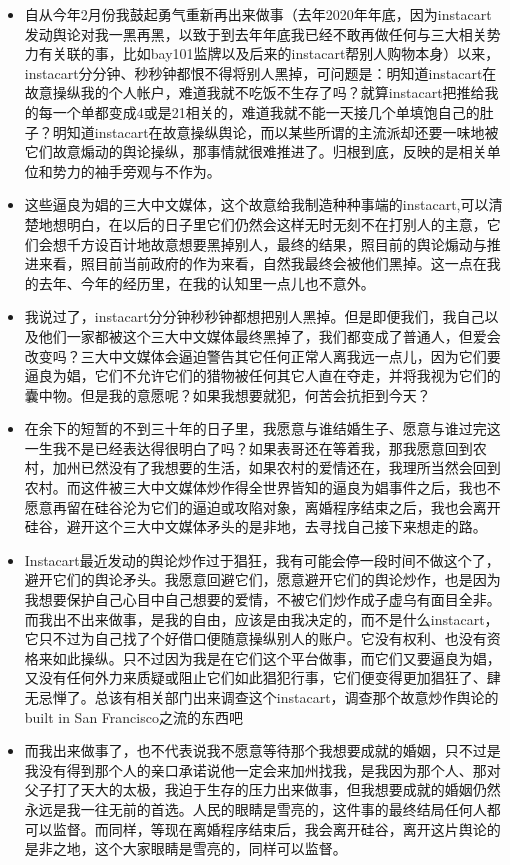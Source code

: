 \documentclass[9pt, b5paper]{article}
\begin{document}
\begin{enumerate}
\begin{itemize}
\item 自从今年2月份我鼓起勇气重新再出来做事（去年2020年年底，因为instacart发动舆论对我一黑再黑，以致于到去年年底我已经不敢再做任何与三大相关势力有关联的事，比如bay101监牌以及后来的instacart帮别人购物本身）以来，instacart分分钟、秒秒钟都恨不得将别人黑掉，可问题是：明知道instacart在故意操纵我的个人帐户，难道我就不吃饭不生存了吗？就算instacart把推给我的每一个单都变成4或是21相关的，难道我就不能一天接几个单填饱自己的肚子？明知道instacart在故意操纵舆论，而以某些所谓的主流派却还要一味地被它们故意煽动的舆论操纵，那事情就很难推进了。归根到底，反映的是相关单位和势力的袖手旁观与不作为。
\item 这些逼良为娼的三大中文媒体，这个故意给我制造种种事端的instacart,可以清楚地想明白，在以后的日子里它们仍然会这样无时无刻不在打别人的主意，它们会想千方设百计地故意想要黑掉别人，最终的结果，照目前的舆论煽动与推进来看，照目前当前政府的作为来看，自然我最终会被他们黑掉。这一点在我的去年、今年的经历里，在我的认知里一点儿也不意外。
\item 我说过了，instacart分分钟秒秒钟都想把别人黑掉。但是即便我们，我自己以及他们一家都被这个三大中文媒体最终黑掉了，我们都变成了普通人，但爱会改变吗？三大中文媒体会逼迫警告其它任何正常人离我远一点儿，因为它们要逼良为娼，它们不允许它们的猎物被任何其它人直在夺走，并将我视为它们的囊中物。但是我的意愿呢？如果我想要就犯，何苦会抗拒到今天？
\item 在余下的短暂的不到三十年的日子里，我愿意与谁结婚生子、愿意与谁过完这一生我不是已经表达得很明白了吗？如果表哥还在等着我，那我愿意回到农村，加州已然没有了我想要的生活，如果农村的爱情还在，我理所当然会回到农村。而这件被三大中文媒体炒作得全世界皆知的逼良为娼事件之后，我也不愿意再留在硅谷沦为它们的逼迫或攻陷对象，离婚程序结束之后，我也会离开硅谷，避开这个三大中文媒体矛头的是非地，去寻找自己接下来想走的路。
\item Instacart最近发动的舆论炒作过于猖狂，我有可能会停一段时间不做这个了，避开它们的舆论矛头。我愿意回避它们，愿意避开它们的舆论炒作，也是因为我想要保护自己心目中自己想要的爱情，不被它们炒作成子虚乌有面目全非。而我出不出来做事，是我的自由，应该是由我决定的，而不是什么instacart，它只不过为自己找了个好借口便随意操纵别人的账户。它没有权利、也没有资格来如此操纵。只不过因为我是在它们这个平台做事，而它们又要逼良为娼，又没有任何外力来质疑或阻止它们如此猖犯行事，它们便变得更加猖狂了、肆无忌惮了。总该有相关部门出来调查这个instacart，调查那个故意炒作舆论的built in San Francisco之流的东西吧
\item 而我出来做事了，也不代表说我不愿意等待那个我想要成就的婚姻，只不过是我没有得到那个人的亲口承诺说他一定会来加州找我，是我因为那个人、那对父子打了天大的太极，我迫于生存的压力出来做事，但我想要成就的婚姻仍然永远是我一往无前的首选。人民的眼睛是雪亮的，这件事的最终结局任何人都可以监督。而同样，等现在离婚程序结束后，我会离开硅谷，离开这片舆论的是非之地，这个大家眼睛是雪亮的，同样可以监督。

\end{itemize}
\end{enumerate}
\end{document}
